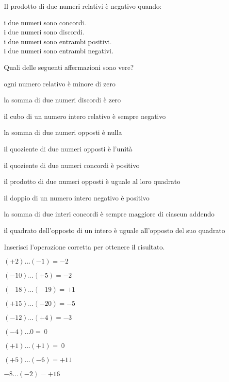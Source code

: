 \begin{esercizio}
Il prodotto di due numeri relativi è negativo quando:
 \begin{multicols}{2}
 \noindent
 \boxA\enspace i due numeri sono concordi.\\
 \boxB\enspace i due numeri sono discordi.\\
 \boxC\enspace i due numeri sono entrambi positivi.\\
 \boxD\enspace i due numeri sono entrambi negativi.
 \end{multicols}
\end{esercizio}

\begin{esercizio}
Quali delle seguenti affermazioni sono vere?
\TabPositions{12cm}
\begin{enumeratea}
 \item ogni numero relativo è minore di zero \tab\boxV\quad\boxF
 \item la somma di due numeri discordi è zero \tab\boxV\quad\boxF
 \item il cubo di un numero intero relativo è sempre negativo 
\tab\boxV\quad\boxF
 \item la somma di due numeri opposti è nulla \tab\boxV\quad\boxF
 \item il quoziente di due numeri opposti è l'unità \tab\boxV\quad\boxF
 \item il quoziente di due numeri concordi è positivo \tab\boxV\quad\boxF
 \item il prodotto di due numeri opposti è uguale al loro quadrato 
\tab\boxV\quad\boxF
 \item il doppio di un numero intero negativo è positivo \tab\boxV\quad\boxF
 \item la somma di due interi concordi è sempre maggiore di ciascun addendo 
\tab\boxV\quad\boxF
 \item il quadrato dell'opposto di un intero è uguale all'opposto del suo 
quadrato \tab\boxV\quad\boxF
\end{enumeratea}
\end{esercizio}

\begin{esercizio}
Inserisci l'operazione corretta per ottenere il risultato.
 \begin{multicols}{3}
 \begin{enumeratea}
 \item $(+2)\ldots(-1) = -2$
 \item $(-10)\ldots(+5) = -2$
 \item $(-18)\ldots(-19) = +1$
 \item $(+15)\ldots(-20) = -5$
 \item $(-12)\ldots(+4) = -3$
 \item $(-4)\ldots0 =~0$
 \item $(+1)\ldots(+1) =~0$
 \item $(+5)\ldots(-6) = +11$
 \item $-8\ldots(-2) = +16$
 \end{enumeratea}
 \end{multicols}
\end{esercizio}


